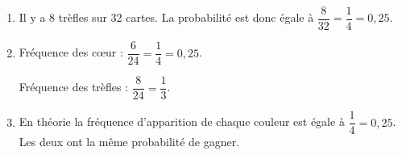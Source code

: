 \documentclass[10pt]{article}
\begin{document}
\begin{enumerate}
\item %
Il y a 8 trèfles sur 32 cartes. La probabilité est donc égale à $\dfrac{8}{32} = \dfrac{1}{4} = 0,25$.
\item %

% 
Fréquence des cœur : $\dfrac{6}{24} = \dfrac{1}{4} = 0,25$.

Fréquence des trèfles : $\dfrac{8}{24} = \dfrac{1}{3}$.
\item %


En théorie la fréquence d’apparition de chaque couleur est égale à $\dfrac{1}{4} = 0,25$. Les deux ont la même probabilité de gagner.
\end{enumerate}
 
\bigskip
\end{document}
